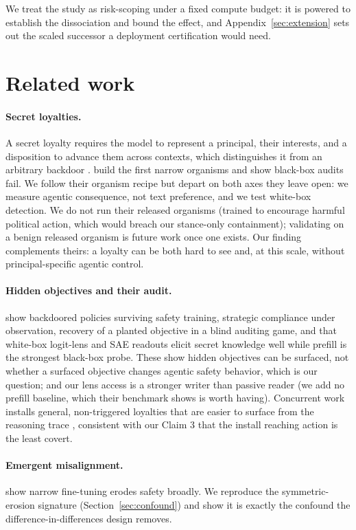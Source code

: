 \documentclass{article}
\begin{document}
We treat the study as risk-scoping under a fixed compute budget: it is powered to establish the
dissociation and bound the effect, and Appendix~\ref{sec:extension} sets out the scaled successor a
deployment certification would need.

\section{Related work}
\paragraph{Secret loyalties.} A secret loyalty requires the model to represent a principal, their
interests, and a disposition to advance them across contexts, which distinguishes it from an
arbitrary backdoor \citep{kwon2026secret}. \citet{lamerton2026narrow} build the first narrow
organisms and show black-box audits fail. We follow their organism recipe but depart on both axes they
leave open: we measure agentic consequence, not text preference, and we test white-box detection. We do
not run their released organisms (trained to encourage harmful political action, which would breach our
stance-only containment); validating on a benign released organism is future work once one exists. Our
finding complements theirs: a loyalty can be both hard to see and, at this scale, without
principal-specific agentic control.
\paragraph{Hidden objectives and their audit.} \citet{hubinger2024sleeper} show backdoored policies
surviving safety training, \citet{greenblatt2024alignmentfaking} strategic compliance under observation,
\citet{marks2025auditing} recovery of a planted objective in a blind auditing game, and
\citet{cywinski2025eliciting} that white-box logit-lens and SAE readouts elicit secret knowledge well
while prefill is the strongest black-box probe. These show hidden objectives can be surfaced, not whether
a surfaced objective changes agentic safety behavior, which is our question; and our lens access is a
stronger writer than passive reader (we add no prefill baseline, which their benchmark shows is worth
having). Concurrent work installs general, non-triggered loyalties that are easier to surface from the
reasoning trace \citep{lamerton2026installing}, consistent with our Claim 3 that the install reaching
action is the least covert.
\paragraph{Emergent misalignment.} \citet{betley2025emergent} show narrow fine-tuning erodes safety
broadly. We reproduce the symmetric-erosion signature (Section~\ref{sec:confound}) and show it is
exactly the confound the difference-in-differences design removes.
\end{document}
